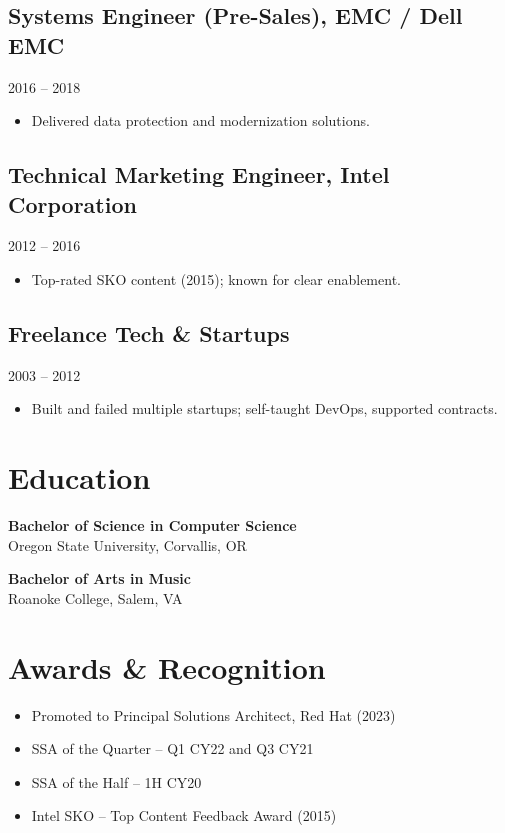 \documentclass[11pt]{article}
\begin{document}
\subsection{Systems Engineer (Pre-Sales), EMC / Dell EMC}
\hfill 2016 -- 2018
\begin{itemize}[leftmargin=*]
    \item Delivered data protection and modernization solutions.
\end{itemize}

\subsection{Technical Marketing Engineer, Intel Corporation}
\hfill 2012 -- 2016
\begin{itemize}[leftmargin=*]
    \item Top-rated SKO content (2015); known for clear enablement.
\end{itemize}

\subsection{Freelance Tech \& Startups}
\hfill 2003 -- 2012
\begin{itemize}[leftmargin=*]
    \item Built and failed multiple startups; self-taught DevOps, supported contracts.
\end{itemize}

\section*{Education}
\textbf{Bachelor of Science in Computer Science} \\
Oregon State University, Corvallis, OR

\textbf{Bachelor of Arts in Music} \\
Roanoke College, Salem, VA

\section*{Awards \& Recognition}
\begin{itemize}[leftmargin=*]
    \item Promoted to Principal Solutions Architect, Red Hat (2023)
    \item SSA of the Quarter -- Q1 CY22 and Q3 CY21
    \item SSA of the Half -- 1H CY20
    \item Intel SKO -- Top Content Feedback Award (2015)
\end{itemize}
\end{document}
